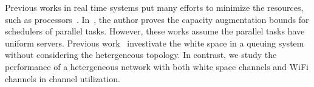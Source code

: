 Previous works in real time systems put many efforts to minimize the resources, such as processors~\cite{nelissen2012techniques}.
In~\cite{li2014analysis}, the author proves the capacity augmentation bounds for schedulers of parallel tasks. 
However, these works assume the parallel tasks have uniform servers. 
Previous work~\cite{chen2011feasibility} investivate the white space in a queuing system without considering the 
hetergeneous topology.
In contrast, we study the performance of a hetergeneous network with both white space channels 
and WiFi channels in channel utilization. 






